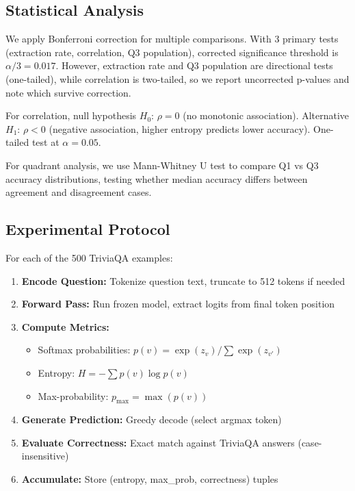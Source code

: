 \subsection{Statistical Analysis}

We apply Bonferroni correction for multiple comparisons. With 3 primary tests (extraction rate, correlation, Q3 population), corrected significance threshold is $\alpha/3 = 0.017$. However, extraction rate and Q3 population are directional tests (one-tailed), while correlation is two-tailed, so we report uncorrected p-values and note which survive correction.

For correlation, null hypothesis $H_0$: $\rho = 0$ (no monotonic association). Alternative $H_1$: $\rho < 0$ (negative association, higher entropy predicts lower accuracy). One-tailed test at $\alpha=0.05$.

For quadrant analysis, we use Mann-Whitney U test to compare Q1 vs Q3 accuracy distributions, testing whether median accuracy differs between agreement and disagreement cases.

\subsection{Experimental Protocol}

For each of the 500 TriviaQA examples:

\begin{enumerate}
\item \textbf{Encode Question:} Tokenize question text, truncate to 512 tokens if needed
\item \textbf{Forward Pass:} Run frozen model, extract logits from final token position
\item \textbf{Compute Metrics:}
   \begin{itemize}
   \item Softmax probabilities: $p(v) = \exp(z_v) / \sum \exp(z_{v'})$
   \item Entropy: $H = -\sum p(v) \log p(v)$
   \item Max-probability: $p_{\max} = \max(p(v))$
   \end{itemize}
\item \textbf{Generate Prediction:} Greedy decode (select argmax token)
\item \textbf{Evaluate Correctness:} Exact match against TriviaQA answers (case-insensitive)
\item \textbf{Accumulate:} Store (entropy, max\_prob, correctness) tuples
\end{enumerate}

